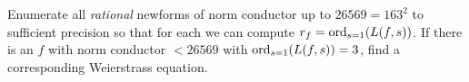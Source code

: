 \documentclass{article}
\begin{document}
\vspace{1em}
Enumerate all {\em rational} newforms of norm conductor up to
$26569=163^2$ to sufficient precision so that for each we can compute
$r_f = \operatorname{ord}_{s=1}(L(f,s))$.  If there is an $f$ with norm conductor
$<26569$ with $\operatorname{ord}_{s=1}(L(f,s))=3$, find a corresponding Weierstrass
equation.
\vspace{1em}
\end{document}
